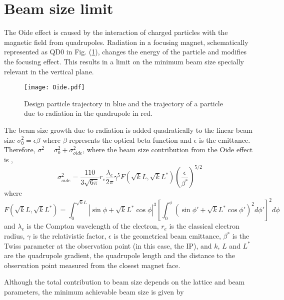 \section{Beam size limit}\label{Oideeffect}
The Oide effect is caused by the interaction of charged particles with the magnetic field from quadrupoles. Radiation in a focusing magnet, schematically represented as QD0 in Fig. (\ref{f:Oideeffect}), changes the energy of the particle and modifies the focusing effect. This results in a limit on the minimum beam size specially relevant in the vertical plane.\par%
\begin{figure}[!hbt]
\texttt{[image: Oide.pdf]}
\centering
\caption{Design particle trajectory in blue and the trajectory of a particle due to radiation in the quadrupole in red.}\label{f:Oideeffect}
\end{figure}
 The beam size growth due to radiation is added quadratically to the linear beam size $\sigma_0^2=\epsilon\beta$ where $\beta$ represents the optical beta function and $\epsilon$ is the emittance. Therefore, $ \sigma^2 = \sigma_0^2 + \sigma_{oide}^2$, where the beam size contribution from the Oide effect is \cite{Oide},
 \begin{equation}
  \sigma^2_{oide} = \frac{110}{3\sqrt{6\pi}}r_e\frac{\lambda_e}{2\pi}\gamma^5 F(\sqrt{k}L,\sqrt{k}L^*)\left(\frac{\epsilon}{\beta^*}\right)^{5/2}
  \label{Oideequ}
 \end{equation}
 where
 \begin{equation}
  F(\sqrt{k}L, \sqrt{k}L^*) = \int_0^{\sqrt{k}L}|\sin\phi+\sqrt{k}L^*\cos\phi|^3\left[\int_0^\phi(\sin\phi'+\sqrt{k}L^*\cos\phi')^2 d\phi'\right]^2d\phi
  \label{OideF}
 \end{equation}
  and $\lambda_e$ is the Compton wavelength of the electron, $r_e$ is the classical electron radius, $\gamma$ is the relativistic factor, $\epsilon$ is the geometrical beam emittance, $\beta^*$ is the Twiss parameter at the observation point (in this case, the IP), and $k$, $L$ and $L^*$ are the quadrupole gradient, the quadrupole length and the distance to the observation point measured from the closest magnet face.\par
   Although the total contribution to beam size depends on the lattice and beam parameters, the minimum achievable beam size is given by \cite{Oide}
